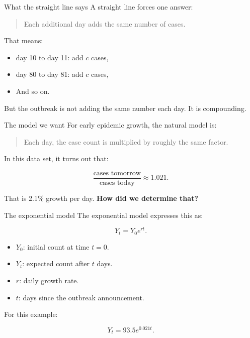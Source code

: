 \documentclass[
  ignorenonframetext,
  aspectratio=43,
]{beamer}
\providecommand{\tightlist}{%
  \setlength{\itemsep}{0pt}\setlength{\parskip}{0pt}}\usepackage{longtable,booktabs,array}
\begin{document}
\begin{frame}{What the straight line says}
\label{what-the-straight-line-says}
A straight line forces one answer:

\begin{quote}
Each additional day adds the same number of cases.
\end{quote}

That means:

\begin{itemize}
\tightlist
\item
  day 10 to day 11: add \(c\) cases,
\item
  day 80 to day 81: add \(c\) cases,
\item
  And so on.
\end{itemize}

But the outbreak is not adding the same number each day. It is
compounding.
\end{frame}

\begin{frame}{The model we want}
\label{the-model-we-want}
For early epidemic growth, the natural model is:

\begin{quote}
Each day, the case count is multiplied by roughly the same factor.
\end{quote}

In this data set, it turns out that:

\[
\frac{\text{cases tomorrow}}{\text{cases today}} \approx 1.021.
\]

That is 2.1\% growth per day. \textbf{How did we determine that?}
\end{frame}

\begin{frame}{The exponential model}
\label{the-exponential-model}
The exponential model expresses this as:

\[
Y_t = Y_0 e^{rt}.
\]

\begin{itemize}
\tightlist
\item
  \(Y_0\): initial count at time \(t=0\).
\item
  \(Y_t\): expected count after \(t\) days.
\item
  \(r\): daily growth rate.
\item
  \(t\): days since the outbreak announcement.
\end{itemize}

For this example:

\[
Y_t = 93.5e^{0.021t}.
\]
\end{frame}
\end{document}
